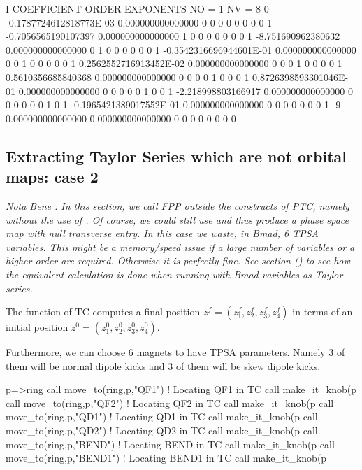 \documentclass{hitec}     %
\begin{document}
{{\begin{code}
    I  COEFFICIENT          ORDER   EXPONENTS
      NO =     1      NV =     8
   0 -0.1787724612818773E-03   0.000000000000000       0  0  0  0  0  0  0  0
   1 -0.7056565190107397       0.000000000000000       1  0  0  0  0  0  0  0
   1  -8.751690962380632       0.000000000000000       0  1  0  0  0  0  0  0
   1 -0.3542316696944601E-01   0.000000000000000       0  0  1  0  0  0  0  0
   1  0.2562552716913452E-02   0.000000000000000       0  0  0  1  0  0  0  0
   1  0.5610356685840368       0.000000000000000       0  0  0  0  1  0  0  0
   1  0.8726398593301046E-01   0.000000000000000       0  0  0  0  0  1  0  0
   1  -2.218998803166917       0.000000000000000       0  0  0  0  0  0  1  0
   1 -0.1965421389017552E-01   0.000000000000000       0  0  0  0  0  0  0  1
    -9   0.000000000000000       0.000000000000000       0  0  0  0  0  0  0  0
\end{code}
\renewcommand{\codefont}{\small}



\subsection{Extracting Taylor Series which are not orbital maps: case 2}\label{s:exttay}

{\it Nota Bene :  In this section, we call FPP outside the constructs of PTC, namely without  the use of . Of course, we could still use  and thus produce a phase space map  with null transverse entry.
In this case we waste, in Bmad, 6 TPSA variables. This might be a memory/speed  issue if a large number of variables or a higher order are required. Otherwise it is perfectly fine.  See section () to see how the equivalent calculation is done when running with Bmad variables as Taylor series.}


The function  of TC computes a final position  $ z^f =(z_{1}^{f},z_{2}^{f},z_{3}^{f},z_{4}^{f})$ in terms of an initial  position
$ z^0 =(z_{1}^{0},z_{2}^{0},z_{3}^{0},z_{4}^{0})$. 

Furthermore, we can choose  6 magnets to have TPSA parameters. Namely 3 of them will be normal dipole kicks and 3 of them will be skew dipole kicks.

\begin{code}
p=>ring%
call move_to(ring,p,"QF1")   !  Locating QF1 in TC
call make_it_knob(p%
call move_to(ring,p,"QF2")  !  Locating QF2 in TC
call make_it_knob(p%
call move_to(ring,p,"QD1")     !  Locating QD1 in TC
call make_it_knob(p%
call move_to(ring,p,"QD2")     !  Locating QD2 in TC
call make_it_knob(p%
call move_to(ring,p,"BEND")     !  Locating BEND in TC
call make_it_knob(p%
call move_to(ring,p,"BEND1")    !  Locating BEND1 in TC
call make_it_knob(p%
\end{code}

}}
\end{document}
